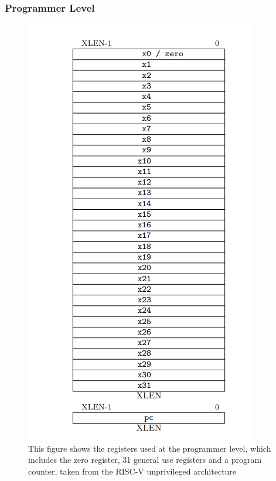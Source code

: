 \subsubsection{Programmer Level}
\begin{figure}
    \includegraphics[height=0.6\textheight]{figures/regs.png}
    \centering
    \caption[RISC-V Registers]{This figure shows the registers used at the programmer level, which includes the zero register, 31 general use registers and a program counter, taken from the RISC-V unprivileged architecture\cite{riscv_unpriv}}
\end{figure}
